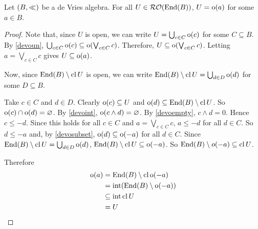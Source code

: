 \begin{theorem}
	\label{contain2}
	Let \( (B,\ll) \) be a de Vries algebra.  For all \( U \in \break \RO(\End(B)) \), \( U = \operatorname{o}(a) \) for some \( a \in B \).
\end{theorem}
\begin{proof}
	Note that, since \( U \) is open, we can write \( U = \bigcup_{c \in C} \operatorname{o}(c) \) for some \( C \subseteq B \).  By \ref{devoun}, \( \bigcup_{c \in C} \operatorname{o}(c) \subseteq \operatorname{o}(\bigvee_{c \in C} c) \).  Therefore, \( U \subseteq \operatorname{o}(\bigvee_{c \in C} c) \).  Letting \( a = \bigvee_{c \in C} c \) gives \( U \subseteq \operatorname{o}(a) \).
	
	Now, since \( \operatorname{End}(B) \setminus \operatorname{cl}{U} \) is open, we can write \( \operatorname{End}(B) \setminus \operatorname{cl}{U} = \bigcup_{d \in D} \operatorname{o}(d) \) for some \( D \subseteq B \).
	
	Take \( c \in C \) and \( d \in D \).  Clearly \( \operatorname{o}(c) \subseteq U \) and \( \operatorname{o}(d) \subseteq \operatorname{End}(B) \setminus \operatorname{cl}{U} \).  So \( \operatorname{o}(c) \cap \operatorname{o}(d) = \varnothing \).  By \ref{devoint}, \( \operatorname{o}(c \wedge d) = \varnothing \).  By \ref{devoempty}, \( c \wedge d = 0 \).  Hence \( c \leq -d \).  Since this holds for all \( c \in C \) and \( a = \bigvee_{c \in C} c \), \( a \leq -d \) for all \( d \in C \).  So \( d \leq -a \) and, by \ref{devosubset}, \( \operatorname{o}(d) \subseteq \operatorname{o}(-a) \) for all \( d \in C \).  Since \( \operatorname{End}(B) \setminus \operatorname{cl}{U} = \bigcup_{d \in D} \operatorname{o}(d) \), \( \operatorname{End}(B) \setminus \operatorname{cl}{U} \subseteq \operatorname{o}(-a) \).  So \( \operatorname{End}(B) \setminus o(-a) \subseteq \operatorname{cl}{U} \).
	
	Therefore
	\begin{align*}
		\operatorname{o}(a) &= \operatorname{End}(B) \setminus \operatorname{cl}{\operatorname{o}(-a)} \\
		&= \operatorname{int}(\operatorname{End}(B) \setminus \operatorname{o}(-a)) \\
		&\subseteq \operatorname{int}\operatorname{cl}{U} \\
		&= U
	\end{align*}
\end{proof}

